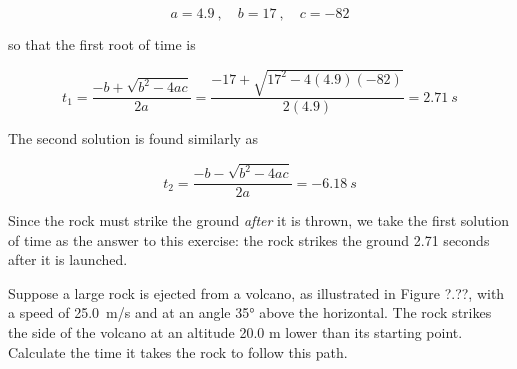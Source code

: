 \documentclass[dvipsnames]{article}
\numberwithin{equation}{section}
\numberwithin{figure}{section}
\begin{document}
\begin{equation*}
    a = 4.9\ , \quad b = 17\ ,\quad c = -82
\end{equation*}

so that the first root of time is

\begin{equation*}
    t_1 = \frac{-b + \sqrt{b^2 - 4ac}}{2a} = \frac{-17 + \sqrt{17^2 - 4(4.9)(-82)}}{2(4.9)} = \SI{2.71}{s}
\end{equation*}

The second solution is found similarly as

\begin{equation*}
    t_2 = \frac{-b - \sqrt{b^2 - 4ac}}{2a} = \SI{-6.18}{s}
\end{equation*}

Since the rock must strike the ground \textit{after} it is thrown, we take the first solution of time as the answer to this exercise: the rock strikes the ground 2.71 seconds after it is launched. 

\solutionEnd

\begin{example}
    Suppose a large rock is ejected from a volcano, as illustrated in Figure ?.??, with a speed of  \SI{25.0}{m/s} and at an angle \ang{35} above the horizontal. The rock strikes the side of the volcano at an altitude 20.0 m lower than its starting point. Calculate the time it takes the rock to follow this path.
\end{example}
\end{document}
